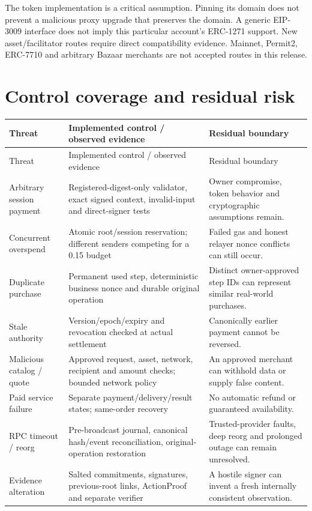 The token implementation is a critical assumption. Pinning its domain does not prevent a malicious proxy upgrade that preserves the domain. A generic EIP-3009 interface does not imply this particular account's ERC-1271 support. New asset/facilitator routes require direct compatibility evidence. Mainnet, Permit2, ERC-7710 and arbitrary Bazaar merchants are not accepted routes in this release.

\section{Control coverage and residual risk}
\begin{longtable}{L{2.6cm}L{6.1cm}L{6cm}}\toprule
Threat & Implemented control / observed evidence & Residual boundary\\\midrule\endfirsthead\toprule Threat & Implemented control / observed evidence & Residual boundary\\\midrule\endhead
Arbitrary session payment & Registered-digest-only validator, exact signed context, invalid-input and direct-signer tests & Owner compromise, token behavior and cryptographic assumptions remain.\\
Concurrent overspend & Atomic root/session reservation; different senders competing for a 0.15 budget & Failed gas and honest relayer nonce conflicts can still occur.\\
Duplicate purchase & Permanent used step, deterministic business nonce and durable original operation & Distinct owner-approved step IDs can represent similar real-world purchases.\\
Stale authority & Version/epoch/expiry and revocation checked at actual settlement & Canonically earlier payment cannot be reversed.\\
Malicious catalog / quote & Approved request, asset, network, recipient and amount checks; bounded network policy & An approved merchant can withhold data or supply false content.\\
Paid service failure & Separate payment/delivery/result states; same-order recovery & No automatic refund or guaranteed availability.\\
RPC timeout / reorg & Pre-broadcast journal, canonical hash/event reconciliation, original-operation restoration & Trusted-provider faults, deep reorg and prolonged outage can remain unresolved.\\
Evidence alteration & Salted commitments, signatures, previous-root links, ActionProof and separate verifier & A hostile signer can invent a fresh internally consistent observation.\\

\end{longtable}
